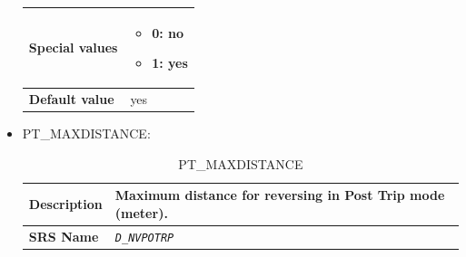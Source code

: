 \documentclass{template/openetcs}
\begin{document}
\begin{itemize}
\begin{longtable}{|l|l|}
				\hline
																																
					\begin{minipage}[t]{0.22\linewidth} \textbf{Special values}	\end{minipage} 
				&	\begin{minipage}[t]{0.78\linewidth} \begin{itemize} \item 0: no \item 1: yes \end{itemize} \end{minipage} \\
								
				\hline
										
					\begin{minipage}[t]{0.22\linewidth} \textbf{Default value}	\end{minipage} 
				&	\begin{minipage}[t]{0.78\linewidth} yes \end{minipage} \\
				
				\hline
				
			\end{longtable}
								
		\item PT\_MAXDISTANCE:
		
			\begin{longtable}{|l|l|}
				\caption{PT\_MAXDISTANCE}\\ 																							
				\hline
				
					\begin{minipage}[t]{0.22\linewidth} \textbf{Description}	\end{minipage} 
				&	\begin{minipage}[t]{0.78\linewidth} Maximum distance for reversing in Post Trip mode (meter). \end{minipage} \\
				
				\hline
				
					\begin{minipage}[t]{0.22\linewidth} \textbf{SRS Name}	\end{minipage} 
				&	\begin{minipage}[t]{0.78\linewidth} \emph{\texttt{D\_NVPOTRP}} \end{minipage} \\
				
				\hline
																																

\end{longtable}
\end{itemize}
\end{document}
